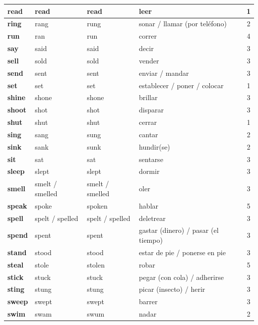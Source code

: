 \documentclass[11pt,a4paper]{article}
\begin{document}
\begin{longtable}{|>{\bfseries}p{2.6cm}|p{3.4cm}|p{3.6cm}|>{\raggedright\arraybackslash}p{6.0cm}|c|}
\rowcolor{amarilloC} read & read & read & leer & 1\\ \hline
\rowcolor{naranjaC} ring & rang & rung & sonar / llamar (por teléfono) & 2\\ \hline
\rowcolor{moradoC} run & ran & run & correr & 4\\ \hline
\rowcolor{verdeC} say & said & said & decir & 3\\ \hline
\rowcolor{verdeC} sell & sold & sold & vender & 3\\ \hline
\rowcolor{verdeC} send & sent & sent & enviar / mandar & 3\\ \hline
\rowcolor{amarilloC} set & set & set & establecer / poner / colocar & 1\\ \hline
\rowcolor{verdeC} shine & shone & shone & brillar & 3\\ \hline
\rowcolor{verdeC} shoot & shot & shot & disparar & 3\\ \hline
\rowcolor{amarilloC} shut & shut & shut & cerrar & 1\\ \hline
\rowcolor{naranjaC} sing & sang & sung & cantar & 2\\ \hline
\rowcolor{naranjaC} sink & sank & sunk & hundir(se) & 2\\ \hline
\rowcolor{verdeC} sit & sat & sat & sentarse & 3\\ \hline
\rowcolor{verdeC} sleep & slept & slept & dormir & 3\\ \hline
\rowcolor{verdeC} smell & smelt / smelled & smelt / smelled & oler & 3\\ \hline
\rowcolor{rojoC} speak & spoke & spoken & hablar & 5\\ \hline
\rowcolor{verdeC} spell & spelt / spelled & spelt / spelled & deletrear & 3\\ \hline
\rowcolor{verdeC} spend & spent & spent & gastar (dinero) / pasar (el tiempo) & 3\\ \hline
\rowcolor{verdeC} stand & stood & stood & estar de pie / ponerse en pie & 3\\ \hline
\rowcolor{rojoC} steal & stole & stolen & robar & 5\\ \hline
\rowcolor{verdeC} stick & stuck & stuck & pegar (con cola) / adherirse & 3\\ \hline
\rowcolor{verdeC} sting & stung & stung & picar (insecto) / herir & 3\\ \hline
\rowcolor{verdeC} sweep & swept & swept & barrer & 3\\ \hline
\rowcolor{naranjaC} swim & swam & swum & nadar & 2\\ \hline

\end{longtable}
\end{document}
